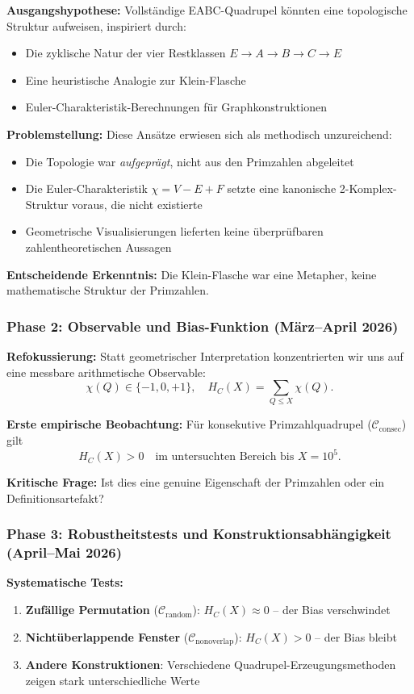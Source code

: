 \documentclass[11pt,a4paper]{article}
\begin{document}
\textbf{Ausgangshypothese:} Vollständige EABC-Quadrupel könnten eine topologische Struktur aufweisen, inspiriert durch:
\begin{itemize}
\item Die zyklische Natur der vier Restklassen $E \to A \to B \to C \to E$
\item Eine heuristische Analogie zur Klein-Flasche
\item Euler-Charakteristik-Berechnungen für Graphkonstruktionen
\end{itemize}

\textbf{Problemstellung:} Diese Ansätze erwiesen sich als methodisch unzureichend:
\begin{itemize}
\item Die Topologie war \textit{aufgeprägt}, nicht aus den Primzahlen abgeleitet
\item Die Euler-Charakteristik $\chi = V - E + F$ setzte eine kanonische 2-Komplex-Struktur voraus, die nicht existierte
\item Geometrische Visualisierungen lieferten keine überprüfbaren zahlentheoretischen Aussagen
\end{itemize}

\textbf{Entscheidende Erkenntnis:} Die Klein-Flasche war eine Metapher, keine mathematische Struktur der Primzahlen.

\subsubsection{Phase 2: Observable und Bias-Funktion (März--April 2026)}

\textbf{Refokussierung:} Statt geometrischer Interpretation konzentrierten wir uns auf eine messbare arithmetische Observable:
\[
\chi(Q) \in \{-1, 0, +1\}, \quad H_C(X) = \sum_{Q \le X} \chi(Q).
\]

\textbf{Erste empirische Beobachtung:} Für konsekutive Primzahlquadrupel ($\mathcal{C}_{\text{consec}}$) gilt
\[
H_C(X) > 0 \quad \text{im untersuchten Bereich bis } X = 10^5.
\]

\textbf{Kritische Frage:} Ist dies eine genuine Eigenschaft der Primzahlen oder ein Definitionsartefakt?

\subsubsection{Phase 3: Robustheitstests und Konstruktionsabhängigkeit (April--Mai 2026)}

\textbf{Systematische Tests:}
\begin{enumerate}
\item \textbf{Zufällige Permutation} ($\mathcal{C}_{\text{random}}$): $H_C(X) \approx 0$ -- der Bias verschwindet
\item \textbf{Nichtüberlappende Fenster} ($\mathcal{C}_{\text{nonoverlap}}$): $H_C(X) > 0$ -- der Bias bleibt
\item \textbf{Andere Konstruktionen}: Verschiedene Quadrupel-Erzeugungsmethoden zeigen stark unterschiedliche Werte
\end{enumerate}
\end{document}
